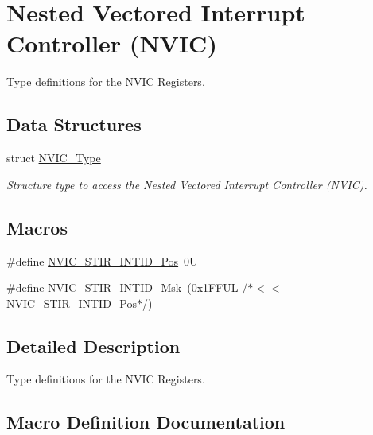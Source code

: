 \hypertarget{group__CMSIS__NVIC}{}\section{Nested Vectored Interrupt Controller (N\+V\+IC)}
\label{group__CMSIS__NVIC}


Type definitions for the N\+V\+IC Registers.  


\subsection*{Data Structures}
\begin{DoxyCompactItemize}
\item 
struct \mbox{\hyperlink{structNVIC__Type}{N\+V\+I\+C\+\_\+\+Type}}
\begin{DoxyCompactList}\small\item\em Structure type to access the Nested Vectored Interrupt Controller (N\+V\+IC). \end{DoxyCompactList}\end{DoxyCompactItemize}
\subsection*{Macros}
\begin{DoxyCompactItemize}
\item 
\#define \mbox{\hyperlink{group__CMSIS__NVIC_ga9eebe495e2e48d302211108837a2b3e8}{N\+V\+I\+C\+\_\+\+S\+T\+I\+R\+\_\+\+I\+N\+T\+I\+D\+\_\+\+Pos}}~0U
\item 
\#define \mbox{\hyperlink{group__CMSIS__NVIC_gae4060c4dfcebb08871ca4244176ce752}{N\+V\+I\+C\+\_\+\+S\+T\+I\+R\+\_\+\+I\+N\+T\+I\+D\+\_\+\+Msk}}~(0x1\+F\+F\+U\+L /$\ast$$<$$<$ N\+V\+I\+C\+\_\+\+S\+T\+I\+R\+\_\+\+I\+N\+T\+I\+D\+\_\+\+Pos$\ast$/)
\end{DoxyCompactItemize}


\subsection{Detailed Description}
Type definitions for the N\+V\+IC Registers. 



\subsection{Macro Definition Documentation}
\mbox{\label{group__CMSIS__NVIC_gae4060c4dfcebb08871ca4244176ce752}} 

